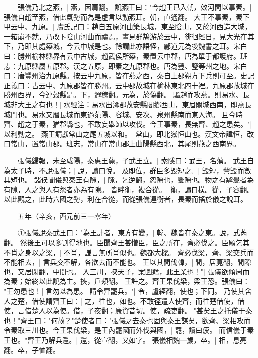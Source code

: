　　張儀乃北之燕，|{
	燕，因肩翻。
	}
說燕王曰："今趙王已入朝，效河間以事秦。|{
	張儀自趙至燕，借此氣勢而為是虛言以動燕耳。朝，直遙翻。
	}
大王不事秦，秦下甲云中、九原。|{
	虞氏記曰：趙自五原河曲築長城，東至陰山，又於河西造大城，一箱崩不就，乃改卜陰山河曲而禱焉，晝見群鵠游於云中，徘徊經日，見大光在其下，乃即其處築城，今云中城是也。餘謂此亦語怪，酈道元為後魏書之耳。宋白曰：勝州榆林縣界有云中古城，趙武侯所築，秦置云中郡，唐為單于都護府。班志：九原縣屬五原郡。漢之五原，即秦之九原郡也。唐為豐、鹽等州之地。宋白曰：唐豐州治九原縣。按云中九原，皆在燕之西，秦自上郡朔方下兵則可至。史記正義曰：古云中、九原郡皆在勝州。云中郡故城在榆林東北四十裡。九原郡故城在勝州西界，今連穀縣是。下，遐稼翻。元為，於偽翻。
	}
驅趙而攻燕。則易水、長城非大王之有也！|{
	水經注：易水出涿郡故安縣閻鄉西山，東屆關城西南，即燕長城門也。易水又曆長城而東過范陽、容城、安次、泉州縣南而東入海。
	}
且今時齊、趙之于秦，猶郡縣也，不敢妄舉師以攻伐。今王事秦，長無齊、趙之患矣。"|{
	以利動之。
	}
燕王請獻常山之尾五城以和。|{
	常山，即北嶽恒山也。漢文帝諱恒，改曰常山，置常山郡。班志，常山在常山郡上曲陽縣西北，其尾則燕之西南界。
	}

　　張儀歸報，未至咸陽，秦惠王薨，子武王立。|{
	索隱曰：武王，名蕩。
	}
武王自為太子時，不說張儀；|{
	說，讀曰悅。
	}
及即位，群臣多毀短之。|{
	毀短，訾毀而數其短也。
	}
諸侯聞儀與秦王有隙，|{
	隙，乞逆翻，怨隙也，釁隙也。物之有罅釁者為有隙，人之與人有怨者亦為有隙。
	}
皆畔衡，複合從。|{
	衡，讀曰橫。從，子容翻。以此觀之，此時六國之勢，利在合從，而從張儀連衡者，畏秦而搖於儀之說耳。
	}

　　五年（辛亥，西元前三一零年）

　　①張儀說秦武王曰："為王計者，東方有變，|{
	韓、魏皆在秦之東。說，式芮翻。
	}
然後王可以多割得地也。臣聞齊王甚憎臣，臣之所在，齊必伐之。臣願乞其不肖之身以之梁，|{
	不肖，謙言無所肖似也。魏都大樑。
	}
齊必伐梁，齊、梁交兵而不能相去，|{
	言兵交不解，各欲去而不能也。
	}
王以其間伐韓，|{
	間，居莧翻，間隙也，又居閑翻，中間也。
	}
入三川，挾天子，案圖籍，此王業也！"|{
	張儀欲傾周而為秦；始終以此說為主。挾，戶頰翻。
	}
王許之。齊王果伐梁，梁王恐。張儀曰： "王勿患也！|{
	言勿以為患。
	}
請令齊罷兵。"|{
	令，盧經翻，使也；下同。
	}
乃使其舍人之楚，借使謂齊王曰：|{
	之，往也，如也。不敢徑遣人使齊，而往楚借使，借使，言借楚人以為使。借，子夜翻；康資昔切。使，疏吏翻。
	}
"甚矣王之托儀于秦也！"齊王曰："何故？"楚使者曰："張儀之去秦也固與秦王謀矣，欲齊、梁相攻而令秦取三川也。今王果伐梁，是王內罷國而外伐與國，|{
	罷，讀曰疲。
	}
而信儀于秦王也。"齊王乃解兵還。|{
	還，從宣翻，又如字。
	}
張儀相魏一歲，卒。|{
	相，息亮翻。卒，子恤翻。
	}


